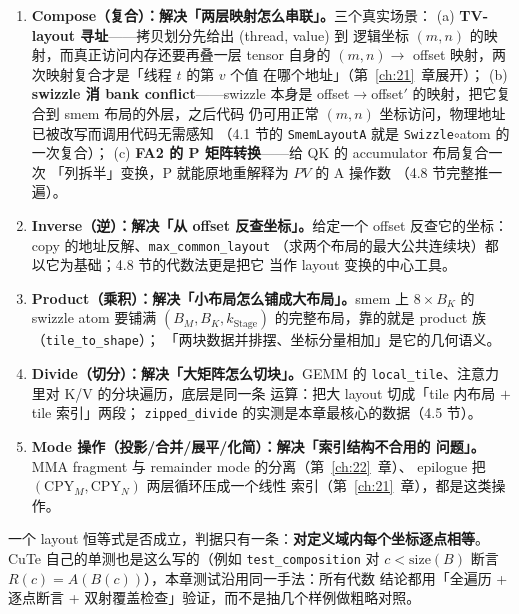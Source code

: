 \begin{enumerate}
  \item \textbf{Compose（复合）：解决「两层映射怎么串联」。}三个真实场景：
        (a) \textbf{TV-layout 寻址}——拷贝划分先给出 (thread, value) 到
        逻辑坐标 $(m,n)$ 的映射，而真正访问内存还要再叠一层 tensor 自身的
        $(m,n)\to$ offset 映射，两次映射复合才是「线程 $t$ 的第 $v$ 个值
        在哪个地址」（第~\ref{ch:21}~章展开）；
        (b) \textbf{swizzle 消 bank conflict}——swizzle 本身是
        offset$\to$offset$'$ 的映射，把它复合到 smem 布局的外层，之后代码
        仍可用正常 $(m,n)$ 坐标访问，物理地址已被改写而调用代码无需感知
        （4.1 节的 \texttt{SmemLayoutA} 就是 \texttt{Swizzle}$\circ$atom
        的一次复合）；
        (c) \textbf{FA2 的 P 矩阵转换}——给 QK 的 accumulator 布局复合一次
        「列拆半」变换，P 就能原地重解释为 $PV$ 的 A 操作数
        （4.8 节完整推一遍）。
  \item \textbf{Inverse（逆）：解决「从 offset 反查坐标」。}给定一个 offset
        反查它的坐标：copy 的地址反解、\texttt{max\_\allowbreak{}common\_\allowbreak{}layout}
        （求两个布局的最大公共连续块）都以它为基础；4.8 节的代数法更是把它
        当作 layout 变换的中心工具。
  \item \textbf{Product（乘积）：解决「小布局怎么铺成大布局」。}\allowbreak{}smem 上
        $8\times B_K$ 的 swizzle atom 要铺满 $(B_M,B_K,k_{\mathrm{Stage}})$
        的完整布局，靠的就是 product 族（\texttt{tile\_\allowbreak{}to\_\allowbreak{}shape}）；
        「两块数据并排摆、坐标分量相加」是它的几何语义。
  \item \textbf{Divide（切分）：解决「大矩阵怎么切块」。}\allowbreak{}GEMM 的
        \texttt{local\_tile}、注意力里对 K/V 的分块遍历，底层是同一条
        运算：把大 layout 切成「tile 内布局 $+$ tile 索引」两段；
        \texttt{zipped\_\allowbreak{}divide} 的实测是本章最核心的数据（4.5 节）。
  \item \textbf{Mode 操作（投影/合并/展平/化简）：解决「索引结构不合用的
        问题」。}\allowbreak{}MMA fragment 与 remainder mode 的分离（第~\ref{ch:22}~章）、
        epilogue 把 $(\mathrm{CPY}_M,\mathrm{CPY}_N)$ 两层循环压成一个线性
        索引（第~\ref{ch:21}~章），都是这类操作。
\end{enumerate}

一个 layout 恒等式是否成立，判据只有一条：\textbf{对定义域内每个坐标逐点相等}。
CuTe 自己的单测也是这么写的（例如 \texttt{test\_\allowbreak{}composition} 对
$c<\mathrm{size}(B)$ 断言 $R(c)=A(B(c))$），本章测试沿用同一手法：所有代数
结论都用「全遍历 + 逐点断言 + 双射覆盖检查」验证，而不是抽几个样例做粗略对照。

